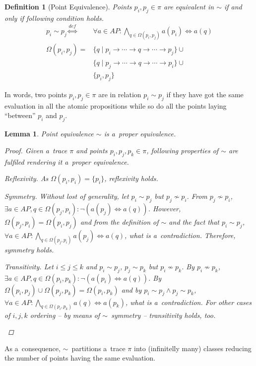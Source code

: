 \documentclass[12pt,oneside,draft]{fithesis}
\newtheorem{mydef}{Definition}
\newtheorem{mylemma}{Lemma}
\begin{document}
\begin{mydef}[Point Equivalence]
Points $p_i,p_j\in\pi$ are equivalent in $\sim$ if and only if following
condition holds.
\begin{align}
	p_i\sim p_j	\overset{def}{\iff}&\forall a\in AP:
		\bigwedge_{q\in\Omega(p_i,p_j)}a(p_i)\iff a(q)\\
\Omega(p_i,p_j)=&\{q\mid p_i\rightarrow\dotsm\rightarrow q
		\rightarrow\dotsm\rightarrow p_j\}\cup\nonumber\\
		&\{q\mid p_j\rightarrow\dotsm\rightarrow q\rightarrow\dotsm
		\rightarrow p_i\}\cup\nonumber\\
		&\{p_i,p_j\}
\end{align}
\end{mydef}
In words, two points $p_i,p_j\in\pi$ are in relation $p_i\sim p_j$ if
they have got the same evaluation in all the atomic propositions while
so do all the points laying ``between'' $p_i$ and $p_j$.
\begin{mylemma}
Point equivalence $\sim$ is a~proper equivalence.
\begin{proof}Given a~trace $\pi$ and points $p_i,p_j,p_k\in\pi$,
following properties of $\sim$ are fulfiled rendering it a~proper
equivalence.
	\begin{inparaenum}
		\item{Reflexivity.} As $\Omega(p_i,p_i)=\{p_i\}$,
			reflexivity holds.
		\item{Symmetry.} Without lost of generality, let $p_i\sim p_j$
			but $p_j\not\sim p_i$. From $p_j\not\sim p_i$,
			$\exists a\in AP,q\in\Omega(p_j, p_i):\neg(a(p_j)
			\iff a(q))$. However, $\Omega(p_j, p_i)=\Omega(p_i,p_j)$
			and from the definition of $\sim$ and the fact that
			$p_i\sim p_j$,
			$\forall a\in AP:\bigwedge_{q\in\Omega(p_j,p_i)}a(p_j)\iff
			a(q)$, what is a~contradiction. Therefore, symmetry holds.
		\item{Transitivity.} Let $i\leq j\leq k$ and $p_i\sim p_j$,
			$p_j\sim p_k$ but $p_i\not\sim p_k$. By $p_i\not\sim p_k$,
			$\exists a\in AP, q\in\Omega(p_i, p_k):
			\neg(a(p_i)\iff a(q))$. By
			$\Omega(p_i,p_j)\cup\Omega(p_j,p_k)=\Omega(p_i,p_k)$ and by
			$p_i\sim p_j\wedge p_j\sim p_k$,
			$\forall a\in AP:\bigwedge_{q\in\Omega(p_i,p_k)}a(q)
			\iff a(p_k)$, what is a~contradiction. For other cases of
			$i,j,k$ ordering -- by means of $\sim$~symmetry --
			transitivity holds, too.
	\end{inparaenum}
	\qedhere
\end{proof}
\end{mylemma}
As a~consequence, $\sim$~partitions a~trace $\pi$ into
(infinitelly many) classes reducing the number of points
having the same evaluation.
\end{document}
